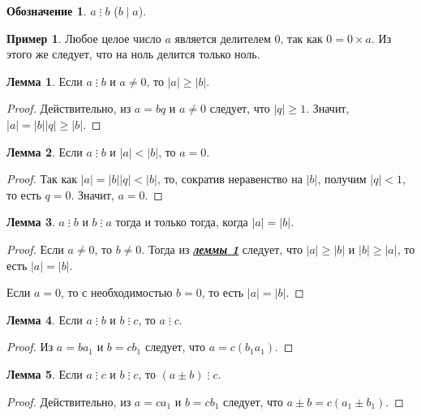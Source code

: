 \documentclass[14pt, a4paper]{extarticle}
\theoremstyle{definition}
\newtheorem{lemma}{Лемма}
\newtheorem*{desig}{Обозначение}
\newtheorem{example}{Пример}
\newcommand{\divisible}{\mathop{\vdots}}
\begin{document}
	\begin{desig}
		$a\divisible b$ ($b\mid a$).
	\end{desig}
	
	\begin{example}
		Любое целое число $a$ является делителем $0$, так как \mbox{$0=0\times a$}. Из этого же следует, что на ноль делится только ноль.
	\end{example}

	\begin{lemma}
	\label{geq}
		Если $a\divisible b$ и $a\neq0$, то $|a|\geqslant|b|$.
	\end{lemma}
	\begin{proof}
		Действительно, из $a=bq$ и $a\neq0$ следует, что $|q|\geqslant1$. Значит, $|a|=|b||q|\geqslant|b|$.
	\end{proof}

	\begin{lemma}
	\label{leq}
		Если $a\divisible b$ и $|a|<|b|$, то $a=0$.
	\end{lemma}
	\begin{proof}
		Так как $|a|=|b||q|<|b|$, то, сократив неравенство на $|b|$, получим $|q|<1$, то есть $q=0$. Значит, $a=0$.
	\end{proof}

	\begin{lemma}
	\label{rav}
		$a\divisible b$ и $b\divisible a$ тогда и только тогда, когда $|a|=|b|$.
	\end{lemma}
	\begin{proof}
		Если $a\neq0$, то $b\neq0$. Тогда из \hyperref[geq]{\textbf{\textit{леммы \ref*{geq}}}} следует, что $|a|\geqslant|b|$ и $|b|\geqslant|a|$, то есть $|a|=|b|$.
		
		Если $a=0$, то с необходимостью $b=0$, то есть $|a|=|b|$.
	\end{proof}

	\begin{lemma}
	\label{tran}
		Если $a\divisible b$ и $b\divisible c$, то $a\divisible c$.
	\end{lemma}
	\begin{proof}
		Из $a=ba_1$ и $b=cb_1$ следует, что $a=c(b_1a_1)$.
	\end{proof}

	\begin{lemma}
	\label{sum}
		Если $a\divisible c$ и $b\divisible c$, то $(a\pm b)\divisible c$.
	\end{lemma}
	\begin{proof}
		Действительно, из $a=ca_1$ и $b=cb_1$ следует, что $a\pm b=c(a_1\pm b_1)$.
	\end{proof}
\end{document}
